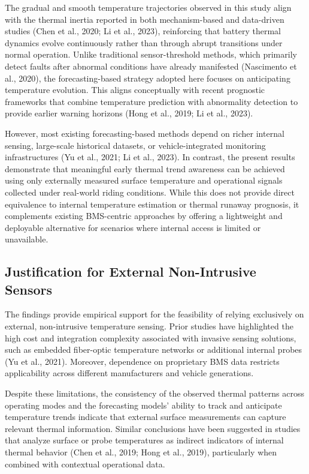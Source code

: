 \documentclass[conference]{IEEEtran}
\begin{document}
The gradual and smooth temperature trajectories observed in this study align with the thermal inertia reported in both mechanism-based and data-driven studies (Chen et al., 2020; Li et al., 2023), reinforcing that battery thermal dynamics evolve continuously rather than through abrupt transitions under normal operation. Unlike traditional sensor-threshold methods, which primarily detect faults after abnormal conditions have already manifested (Nascimento et al., 2020), the forecasting-based strategy adopted here focuses on anticipating temperature evolution. This aligns conceptually with recent prognostic frameworks that combine temperature prediction with abnormality detection to provide earlier warning horizons (Hong et al., 2019; Li et al., 2023).

However, most existing forecasting-based methods depend on richer internal sensing, large-scale historical datasets, or vehicle-integrated monitoring infrastructures (Yu et al., 2021; Li et al., 2023). In contrast, the present results demonstrate that meaningful early thermal trend awareness can be achieved using only externally measured surface temperature and operational signals collected under real-world riding conditions. While this does not provide direct equivalence to internal temperature estimation or thermal runaway prognosis, it complements existing BMS-centric approaches by offering a lightweight and deployable alternative for scenarios where internal access is limited or unavailable.

\subsection{Justification for External Non-Intrusive Sensors}

The findings provide empirical support for the feasibility of relying exclusively on external, non-intrusive temperature sensing. Prior studies have highlighted the high cost and integration complexity associated with invasive sensing solutions, such as embedded fiber-optic temperature networks or additional internal probes (Yu et al., 2021). Moreover, dependence on proprietary BMS data restricts applicability across different manufacturers and vehicle generations.

Despite these limitations, the consistency of the observed thermal patterns across operating modes and the forecasting models’ ability to track and anticipate temperature trends indicate that external surface measurements can capture relevant thermal information. Similar conclusions have been suggested in studies that analyze surface or probe temperatures as indirect indicators of internal thermal behavior (Chen et al., 2019; Hong et al., 2019), particularly when combined with contextual operational data.
\end{document}
